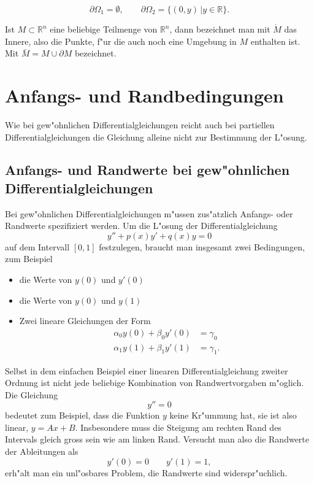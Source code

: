 \begin{beispiel}
\[
\partial \Omega_1=\emptyset,\qquad\partial \Omega_2=\{(0,y)\,|y\in\mathbb R\}.
\]
\end{beispiel}

\begin{definition}
Ist $M\subset\mathbb R^n$ eine beliebige Teilmenge von $\mathbb R^n$,
dann bezeichnet man mit $\mathring M$ das Innere, also die Punkte,
f"ur die auch noch eine Umgebung in $M$ enthalten ist. Mit
$\bar M=M\cup\partial M$ bezeichnet. %
\end{definition}

\section{Anfangs- und Randbedingungen\label{klassifikation:randbedingungen}}
Wie bei gew"ohnlichen Differentialgleichungen reicht auch bei
partiellen Differentialgleichungen die Gleichung alleine nicht
zur Bestimmung der L"osung.
\subsection{Anfangs- und Randwerte bei gew"ohnlichen Differentialgleichungen\label{klassifkation:anfangswerte-ode}}
Bei gew"ohnlichen Differentialgleichungen
m"ussen zus"atzlich Anfangs- oder Randwerte spezifiziert werden.
Um die L"osung der Differentialgleichung
\[
y''+p(x)y'+q(x)y=0
\]
auf dem Intervall $[0,1]$
festzulegen, braucht man insgesamt zwei Bedingungen, zum Beispiel
\begin{itemize}
\item die Werte von $y(0)$ und $y'(0)$
\item die Werte von $y(0)$ und $y(1)$
\item Zwei lineare Gleichungen der Form
\begin{align*}
\alpha_0y(0)+\beta_0y'(0)&=\gamma_0\\
\alpha_1y(1)+\beta_1y'(1)&=\gamma_1.
\end{align*}
\end{itemize}

\begin{beispiel}
Selbst in dem einfachen Beispiel einer linearen Differentialgleichung
zweiter Ordnung ist nicht jede beliebige Kombination von Randwertvorgaben
m"oglich. Die Gleichung
\[
y''=0
\]
bedeutet zum Beispiel, dass die Funktion $y$ keine Kr"ummung hat, sie
ist also linear, $y=Ax+B$. Insbesondere muss die Steigung am rechten
Rand des Intervals gleich gross sein wie am linken Rand. Versucht man
also die Randwerte der Ableitungen als
\[
y'(0)=0\qquad y'(1)=1,
\]
erh"alt man ein unl"osbares Problem, die Randwerte sind widerspr"uchlich.
\end{beispiel}

